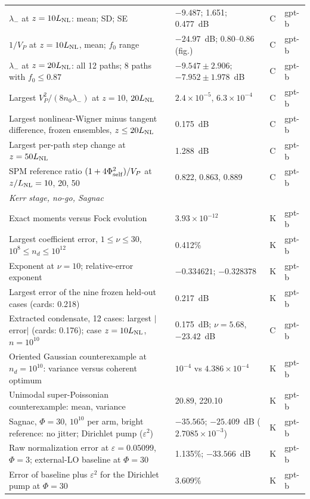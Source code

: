 \documentclass[aps,pra,twocolumn,superscriptaddress,nofootinbib,floatfix]{revtex4-2}
\newcommand{\LNL}{L_{\rm NL}}
\begin{document}
\begin{table}[t]
\begin{ruledtabular}
\begin{tabular}{p{9.4cm}p{4.8cm}p{0.9cm}p{1.9cm}}
\raggedright $\lambda_-$ at $z=10\LNL$: mean; SD; SE & \raggedright $-9.487$; 1.651; 0.477~dB & \raggedright C & \raggedright gpt-b \tabularnewline
\raggedright $1/V_P$ at $z=10\LNL$, mean; $f_0$ range & \raggedright $-24.97$~dB; 0.80--0.86 (fig.) & \raggedright C & \raggedright gpt-b \tabularnewline
\raggedright $\lambda_-$ at $z=20\LNL$: all 12 paths; 8 paths with $f_0\le0.87$ & \raggedright $-9.547\pm2.906$; $-7.952\pm1.978$~dB & \raggedright C & \raggedright gpt-b \tabularnewline
\raggedright Largest $V_P^2/(8n_0\lambda_-)$ at $z=10$, $20\LNL$ & \raggedright $2.4\times10^{-5}$, $6.3\times10^{-4}$ & \raggedright C & \raggedright gpt-b \tabularnewline
\raggedright Largest nonlinear-Wigner minus tangent difference, frozen ensembles, $z\le20\LNL$ & \raggedright 0.175~dB & \raggedright C & \raggedright gpt-b \tabularnewline
\raggedright Largest per-path step change at $z=50\LNL$ & \raggedright 1.288~dB & \raggedright C & \raggedright gpt-b \tabularnewline
\raggedright SPM reference ratio $(1+4\Phi_{\rm self}^2)/V_P$ at $z/\LNL=10$, 20, 50 & \raggedright 0.822, 0.863, 0.889 & \raggedright C & \raggedright gpt-b \tabularnewline
\multicolumn{4}{l}{\textit{Kerr stage, no-go, Sagnac}} \tabularnewline
\raggedright Exact moments versus Fock evolution & \raggedright $3.93\times10^{-12}$ & \raggedright K & \raggedright gpt-b \tabularnewline
\raggedright Largest coefficient error, $1\le\nu\le30$, $10^8\le n_d\le10^{12}$ & \raggedright 0.412\% & \raggedright K & \raggedright gpt-b \tabularnewline
\raggedright Exponent at $\nu=10$; relative-error exponent & \raggedright $-0.334621$; $-0.328378$ & \raggedright K & \raggedright gpt-b \tabularnewline
\raggedright Largest error of the nine frozen held-out cases (cards: 0.218) & \raggedright 0.217~dB & \raggedright K & \raggedright gpt-b \tabularnewline
\raggedright Extracted condensate, 12 cases: largest $|$error$|$ (cards: 0.176); case $z=10\LNL$, $n=10^{10}$ & \raggedright 0.175~dB; $\nu=5.68$, $-23.42$~dB & \raggedright C & \raggedright gpt-b \tabularnewline
\raggedright Oriented Gaussian counterexample at $n_d=10^{10}$: variance versus coherent optimum & \raggedright $10^{-4}$ vs $4.386\times10^{-4}$ & \raggedright K & \raggedright gpt-b \tabularnewline
\raggedright Unimodal super-Poissonian counterexample: mean, variance & \raggedright 20.89, 220.10 & \raggedright K & \raggedright gpt-b \tabularnewline
\raggedright Sagnac, $\Phi=30$, $10^{10}$ per arm, bright reference: no jitter; Dirichlet pump ($\varepsilon^2$) & \raggedright $-35.565$; $-25.409$~dB ($2.7085\times10^{-3}$) & \raggedright K & \raggedright gpt-b \tabularnewline
\raggedright Raw normalization error at $\varepsilon=0.05099$, $\Phi=3$; external-LO baseline at $\Phi=30$ & \raggedright 1.135\%; $-33.566$~dB & \raggedright K & \raggedright gpt-b \tabularnewline
\raggedright Error of baseline plus $\varepsilon^2$ for the Dirichlet pump at $\Phi=30$ & \raggedright 3.609\% & \raggedright K & \raggedright gpt-b \tabularnewline
\end{tabular}
\end{ruledtabular}
\end{table}
\end{document}
